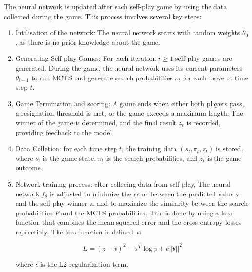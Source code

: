 The neural network is updated after each self-play game by using the data
collected during the game. This process involves several key steps:
\begin{enumerate}
    \item Intilisation of the network: The neural network starts with random weights
          $\theta_0$, as there is no prior knowledge about the game.
    \item Generating Self-play Games: For each iteration $i \geq 1$ self-play games are
          generated. During the game, the neural network uses its current parameters
          $\theta_{i - 1}$ to run MCTS and generate search probabilities $\pi_t$ for each
          move at time step $t$.
    \item Game Termination and scoring: A game ends when either both players pass, a
          resignation threshold is met, or the game exceeds a maximum length. The winner
          of the game is determined, and the final result $z_t$ is recorded, providing
          feedback to the model.
    \item Data Colletion: for each time step $t$, the training data $(s_t, \pi_t, z_t)$
          is stored, where $s_t$ is the game state, $\pi_t$ is the search probabilities,
          and $z_t$ is the game outcome.
    \item Network training process: after collecing data from self-play, The neural
          network $f_\theta$ is adjusted to minimize the error between the predicted
          value v and the self-play winner z, and to maximize the similarity between the
          search probabilities $P$ and the MCTS probabilities. This is done by using a
          loss function that combines the mean-squared error and the cross entropy losses
          repsectibly. The loss function is defined as

          \begin{equation}
              L = (z - v)^2 - \pi^T \log p + c||\theta||^2
          \end{equation}

          where $c$ is the L2 regularization term.

\end{enumerate}

